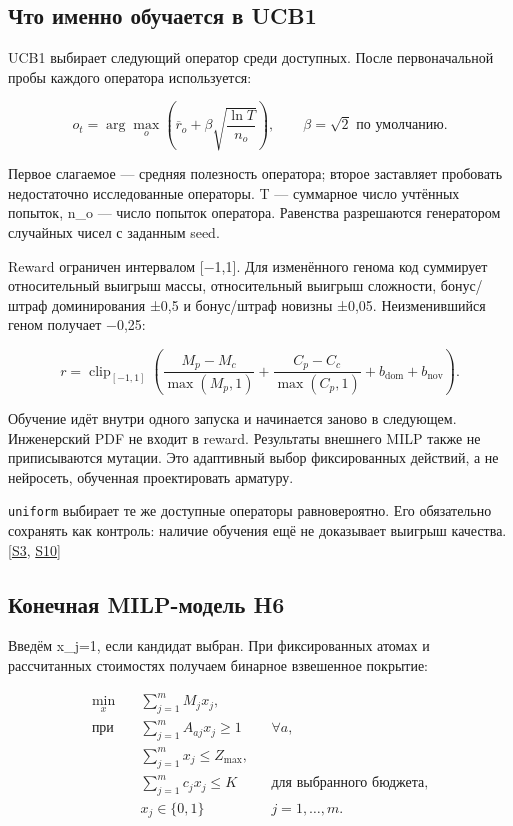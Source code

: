 \documentclass[11pt,a4paper]{article}
\begin{document}
\subsection{Что именно обучается в UCB1}

UCB1 выбирает следующий оператор среди доступных. После первоначальной пробы каждого оператора используется:


\[
o_t=\arg\max_o\left(\overline r_o+
\beta\sqrt{\frac{\ln T}{n_o}}\right),\qquad \beta=\sqrt 2\text{ по умолчанию}.
\]

Первое слагаемое — средняя полезность оператора; второе заставляет пробовать недостаточно исследованные операторы. T — суммарное число учтённых попыток, n\_o — число попыток оператора. Равенства разрешаются генератором случайных чисел с заданным seed.


Reward ограничен интервалом [−1,1]. Для изменённого генома код суммирует относительный выигрыш массы, относительный выигрыш сложности, бонус/штраф доминирования ±0,5 и бонус/штраф новизны ±0,05. Неизменившийся геном получает −0,25:


\[
r=\operatorname{clip}_{[-1,1]}\left(
\frac{M_p-M_c}{\max(M_p,1)}+
\frac{C_p-C_c}{\max(C_p,1)}+b_{\mathrm{dom}}+b_{\mathrm{nov}}
\right).
\]

Обучение идёт внутри одного запуска и начинается заново в следующем. Инженерский PDF не входит в reward. Результаты внешнего MILP также не приписываются мутации. Это адаптивный выбор фиксированных действий, а не нейросеть, обученная проектировать арматуру.


{\small\nolinkurl{uniform}} выбирает те же доступные операторы равновероятно. Его обязательно сохранять как контроль: наличие обучения ещё не доказывает выигрыш качества. {\color{Teal}\small[\hyperlink{S3}{S3}, \hyperlink{S10}{S10}]}


\subsection{Конечная MILP-модель H6}

Введём x\_j=1, если кандидат выбран. При фиксированных атомах и рассчитанных стоимостях получаем бинарное взвешенное покрытие:


\[
\begin{aligned}
\min_x\quad &\sum_{j=1}^{m}M_jx_j,\\
\text{при}\quad &\sum_{j=1}^{m}A_{aj}x_j\ge1&&\forall a,\\
&\sum_{j=1}^{m}x_j\le Z_{\max},\\
&\sum_{j=1}^{m}c_jx_j\le K&&\text{для выбранного бюджета},\\
&x_j\in\{0,1\}&&j=1,\ldots,m.
\end{aligned}
\]
\end{document}
